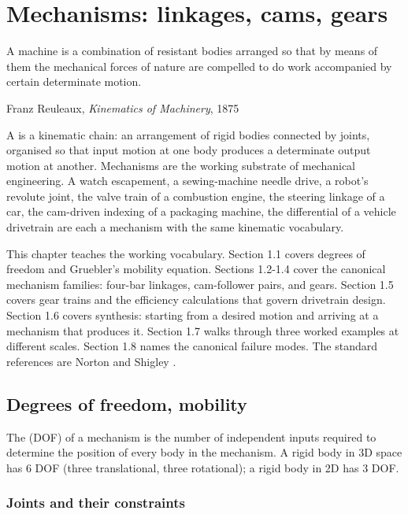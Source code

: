 \chapter{Mechanisms: linkages, cams, gears}
\label{vol08:ch01}

\epigraph{A machine is a combination of resistant bodies arranged so that by means of them the mechanical forces of nature are compelled to do work accompanied by certain determinate motion.}{Franz Reuleaux, \emph{Kinematics of Machinery}, 1875}


\noindent
A  is a kinematic chain: an arrangement of rigid bodies connected by joints, organised so that input motion at one body produces a determinate output motion at another. Mechanisms are the working substrate of mechanical engineering. A watch escapement, a sewing-machine needle drive, a robot's revolute joint, the valve train of a combustion engine, the steering linkage of a car, the cam-driven indexing of a packaging machine, the differential of a vehicle drivetrain are each a mechanism with the same kinematic vocabulary.

This chapter teaches the working vocabulary. Section 1.1 covers degrees of freedom and Gruebler's mobility equation. Sections 1.2-1.4 cover the canonical mechanism families: four-bar linkages, cam-follower pairs, and gears. Section 1.5 covers gear trains and the efficiency calculations that govern drivetrain design. Section 1.6 covers synthesis: starting from a desired motion and arriving at a mechanism that produces it. Section 1.7 walks through three worked examples at different scales. Section 1.8 names the canonical failure modes. The standard references are Norton \cite{text:norton-machinery} and Shigley \cite{text:shigley-mechanical-design}.

\section{Degrees of freedom, mobility}

The  (DOF) of a mechanism is the number of independent inputs required to determine the position of every body in the mechanism. A rigid body in 3D space has 6 DOF (three translational, three rotational); a rigid body in 2D has 3 DOF.

\subsection{Joints and their constraints}


